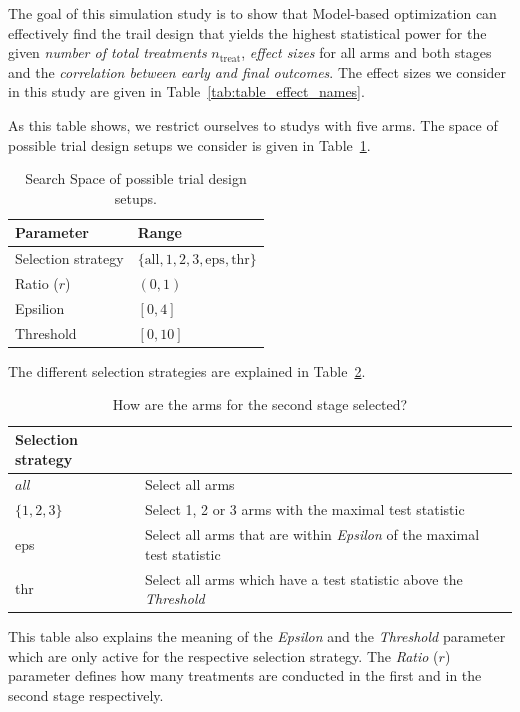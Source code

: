 \documentclass[bimj,fleqn]{w-art}
\theoremstyle{plain}
\theoremstyle{definition}
\begin{document}
The goal of this simulation study is to show that Model-based optimization can effectively find the trail design that yields the highest statistical power for the given \emph{number of total treatments} $n_{\text{treat}}$, \emph{effect sizes} for all arms and both stages and the \emph{correlation between early and final outcomes}.
The effect sizes we consider in this study are given in Table~\ref{tab:table_effect_names}.

As this table shows, we restrict ourselves to studys with five arms.
The space of possible trial design setups we consider is given in Table~\ref{tab:search_space}.
\begin{table}[h]
  \caption{Search Space of possible trial design setups.}
  \label{tab:search_space}
  \centering
  \begin{tabular}{ll}
  \hline
  Parameter          & Range \\
  \hline
  Selection strategy & $\{\text{all}, 1, 2, 3, \text{eps}, \text{thr} \}$ \\
  Ratio ($r$)        & $(0,1)$ \\
  Epsilion           & $[0,4]$ \\
  Threshold          & $[0,10]$ \\
  \hline
  \end{tabular}
\end{table}
The different selection strategies are explained in Table~\ref{tab:selection_strategies}.
\begin{table}[h]
  \caption{How are the arms for the second stage selected?}
  \label{tab:selection_strategies}
  \centering
  \begin{tabular}{ll}
  \hline
  Selection strategy &  \\
  \hline
  $all$              & Select all arms  \\
  $\{1,2,3\}$        & Select 1, 2 or 3 arms with the maximal test statistic \\
  eps                & Select all arms that are within \emph{Epsilon} of the maximal test statistic \\
  thr                & Select all arms which have a test statistic above the \emph{Threshold} \\
  \hline
  \end{tabular}
\end{table}
This table also explains the meaning of the \emph{Epsilon} and the \emph{Threshold} parameter which are only active for the respective selection strategy.
The \emph{Ratio} ($r$) parameter defines how many treatments are conducted in the first and in the second stage respectively.
\end{document}
